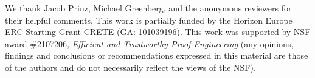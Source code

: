 \documentclass[sigplan,screen]{acmart}
\begin{document}


\maketitle











\begin{acks}
  We thank Jacob Prinz, Michael Greenberg, and the anonymous reviewers
  for their helpful comments.  This work is partially funded by the
  Horizon Europe ERC Starting Grant CRETE (GA: 101039196). This work
  was supported by NSF award \#2107206, {\em Efficient and Trustworthy
    Proof Engineering} (any opinions, findings and conclusions or
  recommendations expressed in this material are those of the authors
  and do not necessarily reflect the views of the NSF).
\end{acks}

\vspace*{2em}





\end{document}
